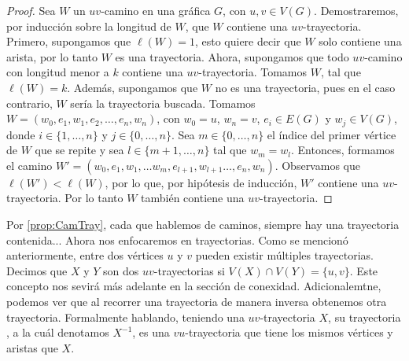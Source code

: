 \begin{proof}
    Sea $W$ un $uv$-camino en una gr\'afica $G$, con $u,v \in V(G)$.
    Demostraremos, por inducci\'on sobre la longitud de $W$, que $W$
    contiene una $uv$-trayectoria. Primero, supongamos que $\ell(W)=1$, esto
    quiere decir que $W$ solo contiene una arista, por lo tanto $W$ es una
    trayectoria. Ahora, supongamos que todo $uv$-camino con longitud menor a
    $k$ contiene una $uv$-trayectoria. Tomamos $W$, tal que $\ell(W) = k$.
    Adem\'as, supongamos que $W$ no es una trayectoria, pues en el caso
    contrario, $W$ ser\'ia la trayectoria buscada. Tomamos $W=
    (w_0,e_1,w_1,e_2, \dots, e_n,w_n)$, con $w_0=u$, $w_n=v$, $e_i \in E(G)$
    y $w_j \in V(G)$, donde $i \in \{1, \dots, n\}$ y $j \in \{0, \dots,
    n\}$. Sea $m \in \{0, \dots, n\}$ el \'indice del primer v\'ertice de
    $W$ que se repite y sea $l \in \{m+1, \dots, n\}$ tal que $w_m = w_l$.
    Entonces, formamos el camino $W'= (w_0,e_1,w_1,\dots w_m, e_{l+1},
    w_{l+1} \dots, e_n,w_n)$. Observamos que $\ell(W')<\ell(W)$, por lo que,
    por hip\'otesis de inducci\'on, $W'$ contiene una $uv$-trayectoria. Por
    lo tanto $W$ tambi\'en contiene una $uv$-trayectoria.
\end{proof}

Por \cref{prop:CamTray}, cada que hablemos de caminos, siempre hay una
trayectoria contenida... Ahora nos enfocaremos en trayectorias. Como se
mencion\'o anteriormente, entre dos v\'ertices $u$ y $v$ pueden existir
m\'ultiples trayectorias. Decimos que $X$ y $Y$ son dos $uv$-trayectorias
 si $V(X)\cap
V(Y)=\{u,v\}$. Este concepto nos sevir\'a m\'as adelante en la secci\'on de
conexidad. Adicionalemtne, podemos ver que al recorrer una trayectoria de
manera inversa obtenemos otra trayectoria. Formalmente hablando, teniendo
una $uv$-trayectoria $X$, su trayectoria , a
la cu\'al denotamos $X^{-1}$, es una $vu$-trayectoria que tiene los mismos
v\'ertices y aristas que $X$.

